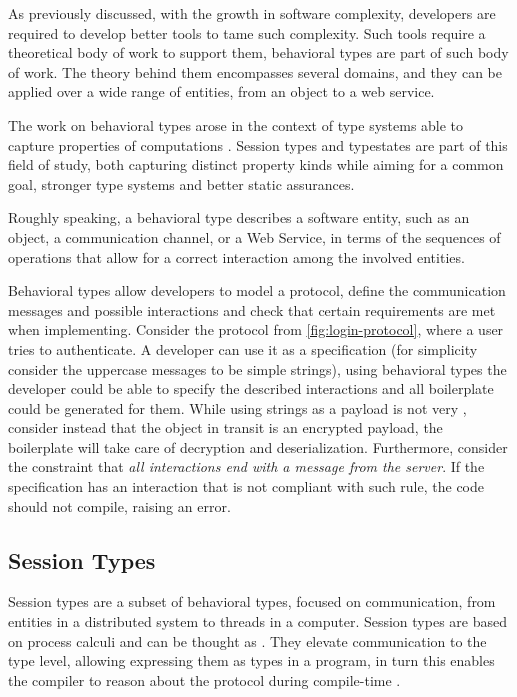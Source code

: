 As previously discussed, with the growth in software complexity, developers are required to develop better tools to tame such complexity.
Such tools require a theoretical body of work to support them, behavioral types are part of such body of work.
The theory behind them encompasses several domains, and they can be applied over a wide range of entities, from an object to a web service.

The work on behavioral types arose in the context of type systems able to capture properties of computations \autocite{Huttel2016}.
Session types and typestates are part of this field of study,
both capturing distinct property kinds while aiming for a common goal,
stronger type systems and better static assurances.

\begin{displayquote}
    Roughly speaking, a behavioral type describes a software entity, such as an object, a communication channel,
    or a Web Service, in terms of the sequences of operations that allow for a correct interaction among the involved entities.
\end{displayquote}

Behavioral types allow developers to model a protocol,
define the communication messages and possible interactions and
check that certain requirements are met when implementing.
Consider the protocol from \autoref{fig:login-protocol},
where a user tries to authenticate.
A developer can use it as a specification
(for simplicity consider the uppercase messages to be simple strings),
using behavioral types the developer could be able to specify the described interactions and all boilerplate could be generated for them.
While using strings as a payload is not very ,
consider instead that the object in transit is an encrypted payload,
the boilerplate will take care of decryption and deserialization.
Furthermore, consider the constraint that \emph{all interactions end with a message from the server}.
If the specification has an interaction that is not compliant with such rule,
the code should not compile, raising an error.



\subsection{Session Types}

Session types are a subset of behavioral types, focused on communication,
from entities in a distributed system to threads in a computer.
Session types are based on process calculi and can be thought as  \autocite{Honda1993, Honda1998}.
They elevate communication to the type level, allowing expressing them as types in a program,
in turn this enables the compiler to reason about the protocol during compile-time \autocite{Gay2015, Vasconcelos2006}.

